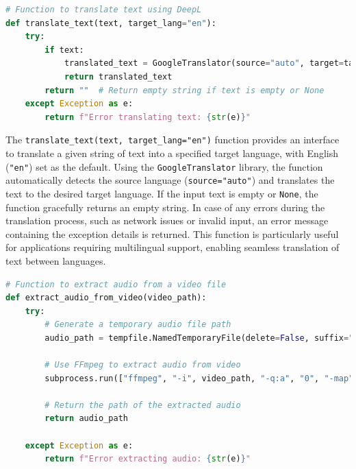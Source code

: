 \begin{tcolorbox}[colback=gray!5!white, colframe=gray!80!black, boxrule=0.5pt, title=Translate Text Using DeepL]
    \begin{lstlisting}[language=Python]
# Function to translate text using DeepL
def translate_text(text, target_lang="en"):
    try:
        if text:
            translated_text = GoogleTranslator(source="auto", target=target_lang).translate(text)
            return translated_text
        return ""  # Return empty string if text is empty or None
    except Exception as e:
        return f"Error translating text: {str(e)}"
    \end{lstlisting}
\end{tcolorbox}

\noindent
The \texttt{translate\_text(text, target\_lang="en")} function provides an interface to translate a given string of text into a specified target language, with English (\texttt{"en"}) set as the default. Using the \texttt{GoogleTranslator} library, the function automatically detects the source language (\texttt{source="auto"}) and translates the text to the desired target language. If the input text is empty or \texttt{None}, the function gracefully returns an empty string. In case of any errors during the translation process, such as network issues or invalid input, an error message containing the exception details is returned. This function is particularly useful for applications requiring multilingual support, enabling seamless translation of text between languages.


\begin{tcolorbox}[colback=gray!5!white, colframe=gray!80!black, boxrule=0.5pt, title=Extract Audio from Video File]
    \begin{lstlisting}[language=Python]
# Function to extract audio from a video file
def extract_audio_from_video(video_path):
    try:
        # Generate a temporary audio file path
        audio_path = tempfile.NamedTemporaryFile(delete=False, suffix=".wav").name

        # Use FFmpeg to extract audio from video
        subprocess.run(["ffmpeg", "-i", video_path, "-q:a", "0", "-map", "a", audio_path, "-y"])

        # Return the path of the extracted audio
        return audio_path

    except Exception as e:
        return f"Error extracting audio: {str(e)}"
    \end{lstlisting}
\end{tcolorbox}

